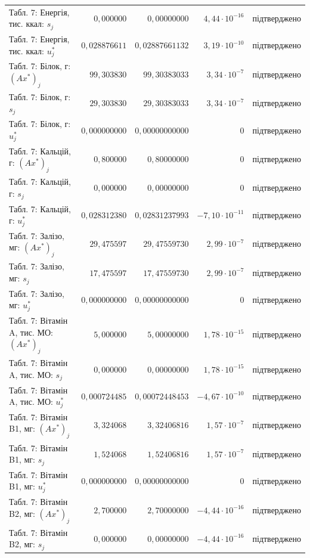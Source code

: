 {\begin{longtable}{>{\raggedright}p{4.3cm}rrr>{\raggedright\arraybackslash}p{2.3cm}}
Табл. 7: Енергія, тис. ккал: $s_j$ & $0{,}000000$ & $0{,}00000000$ & $4{,}44\cdot10^{-16}$ & підтверджено \\
Табл. 7: Енергія, тис. ккал: $u_j^*$ & $0{,}028876611$ & $0{,}02887661132$ & $3{,}19\cdot10^{-10}$ & підтверджено \\
Табл. 7: Білок, г: $(Ax^*)_j$ & $99{,}303830$ & $99{,}30383033$ & $3{,}34\cdot10^{-7}$ & підтверджено \\
Табл. 7: Білок, г: $s_j$ & $29{,}303830$ & $29{,}30383033$ & $3{,}34\cdot10^{-7}$ & підтверджено \\
Табл. 7: Білок, г: $u_j^*$ & $0{,}000000000$ & $0{,}00000000000$ & $0$ & підтверджено \\
Табл. 7: Кальцій, г: $(Ax^*)_j$ & $0{,}800000$ & $0{,}80000000$ & $0$ & підтверджено \\
Табл. 7: Кальцій, г: $s_j$ & $0{,}000000$ & $0{,}00000000$ & $0$ & підтверджено \\
Табл. 7: Кальцій, г: $u_j^*$ & $0{,}028312380$ & $0{,}02831237993$ & $-7{,}10\cdot10^{-11}$ & підтверджено \\
Табл. 7: Залізо, мг: $(Ax^*)_j$ & $29{,}475597$ & $29{,}47559730$ & $2{,}99\cdot10^{-7}$ & підтверджено \\
Табл. 7: Залізо, мг: $s_j$ & $17{,}475597$ & $17{,}47559730$ & $2{,}99\cdot10^{-7}$ & підтверджено \\
Табл. 7: Залізо, мг: $u_j^*$ & $0{,}000000000$ & $0{,}00000000000$ & $0$ & підтверджено \\
Табл. 7: Вітамін A, тис. МО: $(Ax^*)_j$ & $5{,}000000$ & $5{,}00000000$ & $1{,}78\cdot10^{-15}$ & підтверджено \\
Табл. 7: Вітамін A, тис. МО: $s_j$ & $0{,}000000$ & $0{,}00000000$ & $1{,}78\cdot10^{-15}$ & підтверджено \\
Табл. 7: Вітамін A, тис. МО: $u_j^*$ & $0{,}000724485$ & $0{,}00072448453$ & $-4{,}67\cdot10^{-10}$ & підтверджено \\
Табл. 7: Вітамін B1, мг: $(Ax^*)_j$ & $3{,}324068$ & $3{,}32406816$ & $1{,}57\cdot10^{-7}$ & підтверджено \\
Табл. 7: Вітамін B1, мг: $s_j$ & $1{,}524068$ & $1{,}52406816$ & $1{,}57\cdot10^{-7}$ & підтверджено \\
Табл. 7: Вітамін B1, мг: $u_j^*$ & $0{,}000000000$ & $0{,}00000000000$ & $0$ & підтверджено \\
Табл. 7: Вітамін B2, мг: $(Ax^*)_j$ & $2{,}700000$ & $2{,}70000000$ & $-4{,}44\cdot10^{-16}$ & підтверджено \\
Табл. 7: Вітамін B2, мг: $s_j$ & $0{,}000000$ & $0{,}00000000$ & $-4{,}44\cdot10^{-16}$ & підтверджено \\

\end{longtable}}
